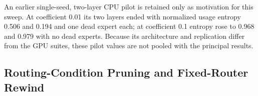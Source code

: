 \documentclass{article}
\begin{document}
An earlier single-seed, two-layer CPU pilot is retained only as motivation for
this sweep. At coefficient 0.01 its two layers ended with normalized usage
entropy 0.506 and 0.194 and one dead expert each; at coefficient 0.1 entropy
rose to 0.968 and 0.979 with no dead experts. Because its architecture and
replication differ from the GPU suites, these pilot values are not pooled with
the principal results.

\begin{table}[t]
\centering
\scriptsize
\caption{Load-balance sweep, mean over three seeds. Dense uncertainty is sample
SD. Selected-route entropy $H$ and dead experts are final logged-step values
averaged over layers within each run and then seeds; direct-pruning losses are
also recorded.}
\label{tab:app_load_balance}
\end{table}

\subsection{Routing-Condition Pruning and Fixed-Router Rewind}
\end{document}
